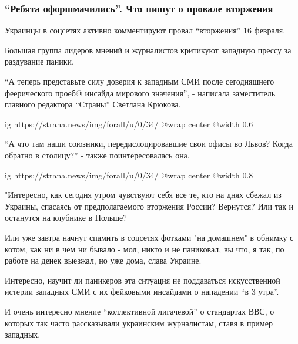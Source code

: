  
 
 
 
 

\subsubsection{\enquote{Ребята офоршмачились}. Что пишут о провале вторжения}

Украинцы в соцсетях активно комментируют провал \enquote{вторжения} 16 февраля.

Большая группа лидеров мнений и журналистов критикуют западную прессу за
раздувание паники.

\enquote{А теперь представьте силу доверия к западным СМИ после сегодняшнего
феерического проеб@ инсайда мирового значения}, - написала заместитель главного
редактора \enquote{Страны} Светлана Крюкова.

\ifcmt
  ig https://strana.news/img/forall/u/0/34/%
  @wrap center
  @width 0.6
\fi

\enquote{А что там наши союзники, передислоцировавшие свои офисы во Львов? Когда
обратно в столицу?} - также поинтересовалась она.

\ifcmt
  ig https://strana.news/img/forall/u/0/34/%
  @wrap center
  @width 0.8
\fi

"Интересно, как сегодня утром чувствуют себя все те, кто на днях сбежал из
Украины, спасаясь от предполагаемого вторжения России? Вернутся? Или так и
останутся на клубнике в Польше?

Или уже завтра начнут спамить в соцсетях фотками "на домашнем" в обнимку с
котом, как ни в чем ни бывало - мол, никто и не паниковал, вы что, я так, по
работе на денек выезжал, но уже дома, слава Украине.

Интересно, научит ли паникеров эта ситуация не поддаваться искусственной
истерии западных СМИ с их фейковыми инсайдами о нападении \enquote{в 3 утра}.

И очень интересно мнение \enquote{коллективной лигачевой} о стандартах ВВС, о которых
так часто рассказывали украинским журналистам, ставя в пример западных.

